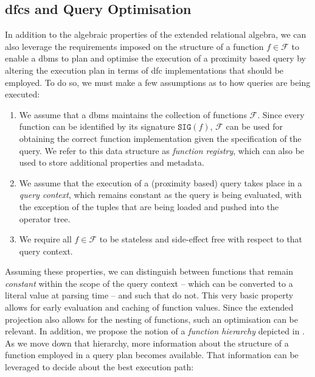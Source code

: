 \subsection{\texorpdfstring{\acrshort{dfc}s}{DFCs} and Query Optimisation}
\label{section:dfc_and_planning}

In addition to the algebraic properties of the extended relational algebra, we can also leverage the requirements imposed on the structure of a function $f \in \mathcal{F}$ to enable a \acrshort{dbms} to plan and optimise the execution of a proximity based query by altering the execution plan in terms of \acrshort{dfc} implementations that should be employed. To do so, we must make a few assumptions as to how queries are being executed: 

\begin{enumerate}
    \item We assume that a \acrshort{dbms} maintains the collection of functions $\mathcal{F}$. Since every function can be identified by its signature $\mathtt{SIG}(f)$, $\mathcal{F}$ can be used for obtaining the correct function implementation given the specification of the query. We refer to this data structure as \emph{function registry}, which can also be used to store additional properties and metadata.
    \item We assume that the execution of a (proximity based) query takes place in a \emph{query context}, which remains constant as the query is being evaluated, with the exception of the tuples that are being loaded and pushed into the operator tree.
    \item We require all $f \in \mathcal{F}$ to be stateless and side-effect free with respect to that query context. 
\end{enumerate}

Assuming these properties, we can distinguish between functions that remain \emph{constant} within the scope of the query context -- which can be converted to a literal value at parsing time -- and such that do not. This very basic property allows for early evaluation and caching of function values. Since the extended projection also allows for the nesting of functions, such an optimisation can be relevant. In addition, we propose the notion of a \emph{function hierarchy} depicted in . As we move down that hierarchy, more information about the structure of a function employed in a query plan becomes available. That information can be leveraged to decide about the best execution path:

